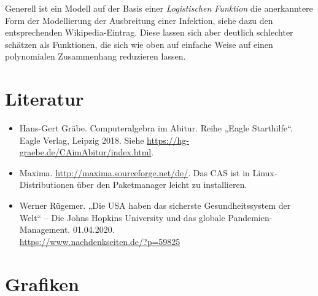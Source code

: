\documentclass[a4paper,11pt]{article}
\begin{document}
Generell ist ein Modell auf der Basis einer \emph{Logistischen Funktion} die
anerkanntere Form der Modellierung der Ausbreitung einer Infektion, siehe dazu
den entsprechenden Wikipedia-Eintrag.  Diese lassen sich aber deutlich
schlechter schätzen als Funktionen, die sich wie oben auf einfache Weise auf
einen polynomialen Zusammenhang reduzieren lassen. 

\section{Literatur}

\begin{itemize}
\item Hans-Gert Gräbe. Computeralgebra im Abitur. Reihe „Eagle Starthilfe“.
  Eagle Verlag, Leipzig 2018.  Siehe
  \url{https://hg-graebe.de/CAimAbitur/index.html}.
\item Maxima. \url{http://maxima.sourceforge.net/de/}. Das CAS ist in
  Linux-Distributionen über den Paketmanager leicht zu installieren.
\item Werner Rügemer. „Die USA haben das sicherste Gesundheitssystem der Welt“
  – Die Johns Hopkins University und das globale Pandemien-Management.
  01.04.2020.\\ \url{https://www.nachdenkseiten.de/?p=59825}
\end{itemize}

\section{Grafiken}
\end{document}
